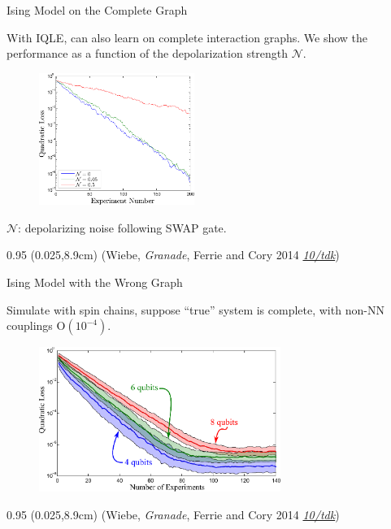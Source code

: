 \documentclass[xcolor=dvipsnames, compress]{beamer}
\renewcommand\UrlFont{\color{red}\rmfamily\itshape}
\newcommand{\shortdoi}[1]{\href{http://doi.org/#1}{\UrlFont 10/#1}}
\newcommand{\OO}{\mathrm{O}}
\newcommand{\bottomnote}[1]{
  \begin{textblock*}{0.95\paperwidth} (0.025\paperwidth,8.9cm)
    {\tiny \hfill #1}
  \end{textblock*}
}
\begin{document}
\begin{frame}{Ising Model on the Complete Graph}
    
    With IQLE, can also learn on complete interaction graphs.
    We show the performance as a function of
    the depolarization strength $\mathcal{N}$.
    
    \begin{figure}
      \centering
      \includegraphics[width=0.45\textwidth]{tpnoise}
    \end{figure}

    $\mathcal{N}$: depolarizing noise following SWAP gate.

  \bottomnote{(Wiebe, \emph{Granade}, Ferrie and Cory 2014 \shortdoi{tdk})}
    
\end{frame}

\begin{frame}{Ising Model with the Wrong Graph}

  Simulate with spin chains, suppose ``true'' system is complete,
  with non-NN couplings $\OO(10^{-4})$.

  \begin{figure}
    \centering
    \includegraphics[width=0.7\textwidth]{badmodel}
  \end{figure}

  \bottomnote{(Wiebe, \emph{Granade}, Ferrie and Cory 2014 \shortdoi{tdk})}

\end{frame}
\end{document}
